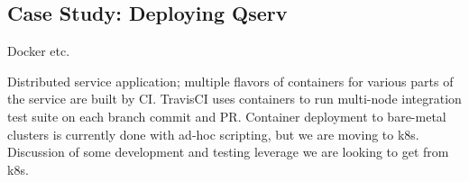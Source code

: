 \subsection{Case Study: Deploying Qserv}

Docker etc.

Distributed service application; multiple flavors of containers for various parts of the service are built by
CI.
TravisCI uses containers to run multi-node integration test suite on each branch commit and PR.
Container deployment to bare-metal clusters is currently done with ad-hoc scripting, but we are moving to k8s.
Discussion of some development and testing leverage we are looking to get from k8s.
